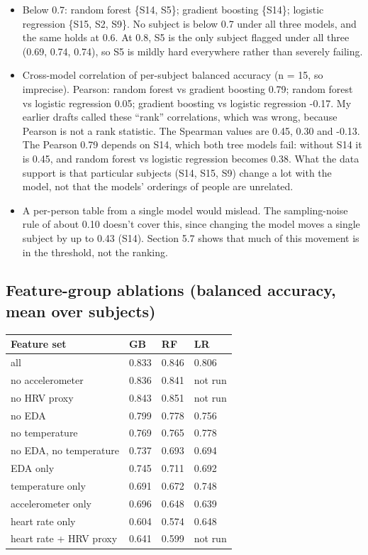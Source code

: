 \documentclass[11pt]{article}
\providecommand{\tightlist}{\setlength{\itemsep}{2pt}\setlength{\parskip}{0pt}}
\begin{document}
\begin{itemize}
\tightlist
\item
  Below 0.7: random forest \{S14, S5\}; gradient boosting \{S14\};
  logistic regression \{S15, S2, S9\}. No subject is below 0.7 under all
  three models, and the same holds at 0.6. At 0.8, S5 is the only
  subject flagged under all three (0.69, 0.74, 0.74), so S5 is mildly
  hard everywhere rather than severely failing.
\item
  Cross-model correlation of per-subject balanced accuracy (n = 15, so
  imprecise). Pearson: random forest vs gradient boosting 0.79; random
  forest vs logistic regression 0.05; gradient boosting vs logistic
  regression -0.17. My earlier drafts called these ``rank''
  correlations, which was wrong, because Pearson is not a rank
  statistic. The Spearman values are 0.45, 0.30 and -0.13. The Pearson
  0.79 depends on S14, which both tree models fail: without S14 it is
  0.45, and random forest vs logistic regression becomes 0.38. What the
  data support is that particular subjects (S14, S15, S9) change a lot
  with the model, not that the models' orderings of people are
  unrelated.
\item
  A per-person table from a single model would mislead. The
  sampling-noise rule of about 0.10 doesn't cover this, since changing
  the model moves a single subject by up to 0.43 (S14). Section 5.7
  shows that much of this movement is in the threshold, not the ranking.
\end{itemize}

\hypertarget{feature-group-ablations-balanced-accuracy-mean-over-subjects}{%
\subsection{Feature-group ablations (balanced accuracy, mean over
subjects)}\label{feature-group-ablations-balanced-accuracy-mean-over-subjects}}

\begin{longtable}[]{@{}llll@{}}
\toprule\noalign{}
Feature set & GB & RF & LR \\
\midrule\noalign{}
\endhead
\bottomrule\noalign{}
\endlastfoot
all & 0.833 & 0.846 & 0.806 \\
no accelerometer & 0.836 & 0.841 & not run \\
no HRV proxy & 0.843 & 0.851 & not run \\
no EDA & 0.799 & 0.778 & 0.756 \\
no temperature & 0.769 & 0.765 & 0.778 \\
no EDA, no temperature & 0.737 & 0.693 & 0.694 \\
EDA only & 0.745 & 0.711 & 0.692 \\
temperature only & 0.691 & 0.672 & 0.748 \\
accelerometer only & 0.696 & 0.648 & 0.639 \\
heart rate only & 0.604 & 0.574 & 0.648 \\
heart rate + HRV proxy & 0.641 & 0.599 & not run \\
\end{longtable}
\end{document}

